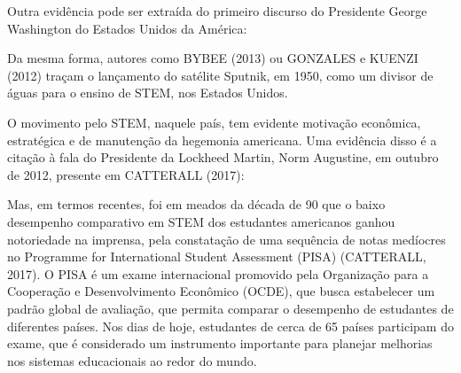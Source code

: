 Outra evidência pode ser extraída do primeiro discurso do Presidente George Washington do Estados Unidos da América:


\noindent\begin{flushright}\mbox{\linespread{1}\selectfont\centering{}}\end{flushright}


Da mesma forma, autores como  BYBEE (2013)  ou  GONZALES e KUENZI (2012) traçam o lançamento do satélite Sputnik, em 1950, como um divisor de águas para o ensino de STEM, nos Estados Unidos.

O movimento pelo STEM, naquele país, tem evidente motivação econômica, estratégica e de manutenção da hegemonia americana. Uma evidência disso é a citação à fala do Presidente da Lockheed Martin, Norm Augustine, em outubro de 2012, presente em  CATTERALL (2017):


\noindent\begin{flushright}\mbox{\linespread{1}\selectfont\centering{}}\end{flushright}


Mas, em termos recentes, foi em meados da década de 90 que o baixo desempenho comparativo em STEM dos estudantes americanos ganhou notoriedade na imprensa, pela constatação de uma sequência de notas medíocres no Programme for International Student Assessment (PISA)  (CATTERALL, 2017). O PISA é um exame internacional promovido pela Organização para a Cooperação e Desenvolvimento Econômico (OCDE), que busca estabelecer um padrão global de avaliação, que permita comparar o desempenho de estudantes de diferentes países. Nos dias de hoje, estudantes de cerca de 65 países participam do exame, que é considerado um instrumento importante para planejar melhorias nos sistemas educacionais ao redor do mundo.

